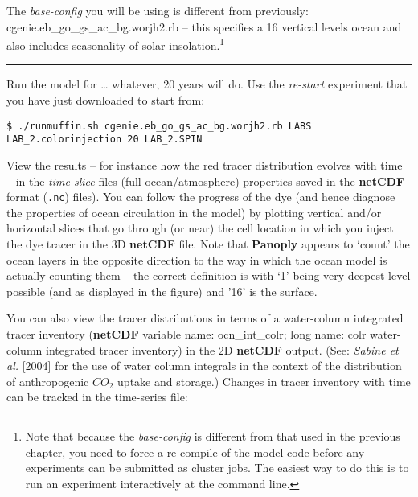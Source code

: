 \vspace{1mm}
The \textit{base-config} you will be using is different from previously: \textsf{\footnotesize cgenie.eb\_go\_gs\_ac\_bg.worjh2.rb} – this specifies a 16 vertical levels ocean and also includes seasonality of solar insolation.\footnote{Note that because the \textit{base-config} is different from that used in the previous chapter, you need to force a re-compile of the model code before any experiments can be submitted as cluster jobs. The easiest way to do this is to run an experiment interactively at the command line.}

\vspace{1mm}
\noindent\rule{4cm}{0.5pt}
\vspace{2mm}

\newpage 

\noindent Run the model for … whatever, 20 years will do. Use the \textit{re-start} experiment that you have just downloaded to start from:

\vspace{-2mm}\small
\begin{verbatim}
$ ./runmuffin.sh cgenie.eb_go_gs_ac_bg.worjh2.rb LABS LAB_2.colorinjection 20 LAB_2.SPIN
\end{verbatim}
\normalsize\vspace{-2mm}

View the results – for instance how the red tracer distribution evolves with time – in the \textit{time-slice} files (full ocean/atmosphere) properties saved in the \textbf{netCDF} format (\texttt{.nc}) files). You can follow the progress of the dye (and hence diagnose the properties of ocean circulation in the model) by plotting vertical and/or horizontal slices that go through (or near) the cell location in which you inject the dye tracer in the 3D \textbf{netCDF} file. Note that \textbf{Panoply} appears to ‘count’ the ocean layers in the opposite direction to the way in which the ocean model is actually counting them – the correct definition is with ‘1’ being very deepest level possible (and as displayed in the figure) and '16' is the surface.

You can also view the tracer distributions in terms of a water-column integrated tracer inventory (\textbf{netCDF} variable name: \textsf{\footnotesize ocn\_int\_colr}; long name: \textsf{\footnotesize colr water-column integrated tracer inventory}) in the 2D \textbf{netCDF} output. (See: \textit{Sabine et al.} [2004] for the use of water column integrals in the context of the distribution of anthropogenic \(CO_{2}\) uptake and storage.) Changes in tracer inventory with time can be tracked in the time-series file:

